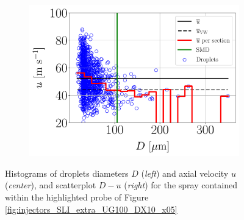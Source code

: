 \begin{figure}[h!]
\begin{subfigure}[b]{0.3\textwidth}
	\centering
   \includegraphics[scale=0.24]{./part2_developments/figures_ch5_resolved_JICF/injectors_SLI_extra/uG100_dx10_x05_vel_scatter}
\end{subfigure}

\caption[Histograms of droplets diameters $D$ (\textsl{left}) and axial velocity $u$ (\textsl{center}), and scatterplot $D - u$ (\textsl{right})]{Histograms of droplets diameters $D$ (\textsl{left}) and axial velocity $u$ (\textsl{center}), and scatterplot $D - u$ (\textsl{right}) for the spray contained within the highlighted probe of Figure \ref{fig:injectors_SLI_extra_UG100_DX10_x05}}
\label{fig:injectors_extra_velocities_interesting}
\end{figure}

%
%
